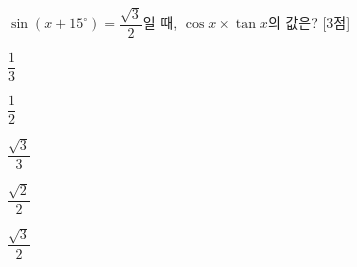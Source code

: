 $\sin(x+15^\circ)=\dfrac{\sqrt{3}}{2}$일 때, $\cos x\times\tan x$의 값은?  \mbox{[3점]}
\begin{choices32}{\rule[-3ex]{0pt}{8ex}$\dfrac{1}{3}$}{\rule[-3ex]{0pt}{8ex}$\dfrac{1}{2}$}{\rule[-3ex]{0pt}{8ex}$\dfrac{\sqrt{3}}{3}$}{\rule[-3ex]{0pt}{8ex}$\dfrac{\sqrt{2}}{2}$}{\rule[-3ex]{0pt}{8ex}$\dfrac{\sqrt{3}}{2}$}\end{choices32}
